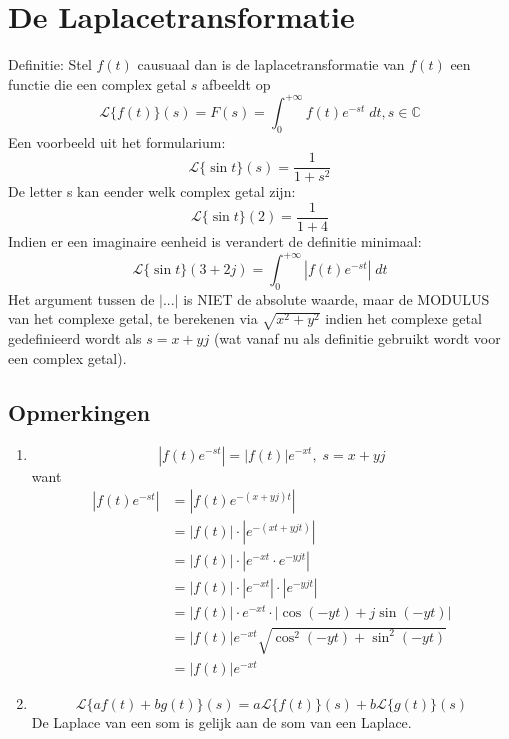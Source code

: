 \documentclass[12pt]{report}
\begin{document}
\section{De Laplacetransformatie}
Definitie: Stel $f(t)$ causuaal dan is de laplacetransformatie van $f(t)$ een functie die een complex getal $s$ afbeeldt op 
$$\mathcal{L}\{f(t)\}(s) = F(s) = \int_{0}^{+\infty}f(t)e^{-st}\;dt, s \in \mathbb{C}$$
Een voorbeeld uit het formularium:
$$\mathcal{L}\{\sin t\}(s) = \frac{1}{1 + s^2}$$
De letter s kan eender welk complex getal zijn:
$$\mathcal{L}\{\sin t\}(2) = \frac{1}{1 + 4}$$
Indien er een imaginaire eenheid is verandert de definitie minimaal:
$$\mathcal{L}\{\sin t\}(3 + 2j) = \int_{0}^{+\infty}|f(t)e^{-st}|\;dt$$
Het argument tussen de $| ... |$ is NIET de absolute waarde, maar de MODULUS van het complexe getal, te berekenen via $\sqrt{x^2 + y^2}$ indien het complexe getal gedefinieerd wordt als $s = x + yj$ (wat vanaf nu als definitie gebruikt wordt voor een complex getal).
\subsection{Opmerkingen}
\begin{enumerate}
\item $$|f(t)e^{-st}| = |f(t)|e^{-xt}, \; s = x+yj$$
want
\begin{equation*}
\begin{split}
|f(t)e^{-st}| & = |f(t)e^{-(x + yj)t}| \\
                & = |f(t)|\cdot|e^{-(xt + yjt)}| \\
                & = |f(t)|\cdot|e^{-xt} \cdot e^{-yjt}| \\
                & = |f(t)|\cdot|e^{-xt}|\cdot|e^{-yjt}| \\
                & = |f(t)|\cdot e^{-xt}\cdot|\cos(-yt) + j\sin(-yt)| \\
                & = |f(t)|e^{-xt}\sqrt{\cos^2{(-yt)} + \sin^2{(-yt)}} \\
                & = |f(t)|e^{-xt}
\end{split}
\end{equation*}
\item 
$$\mathcal{L}\{af(t) + bg(t)\}(s) = a\mathcal{L}\{f(t)\}(s) + b\mathcal{L}\{g(t)\}(s)$$
De Laplace van een som is gelijk aan de som van een Laplace.
\end{enumerate}
\end{document}
